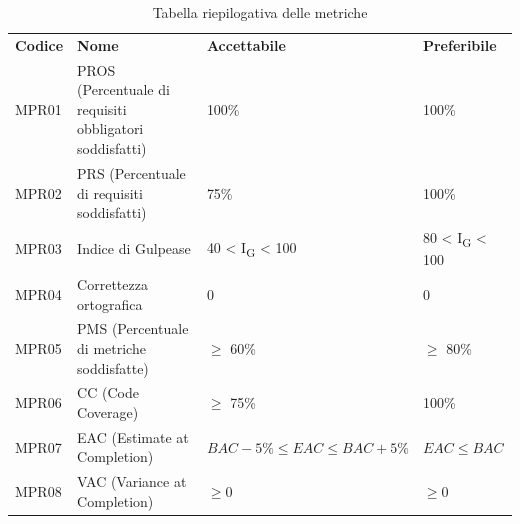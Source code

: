 \begin{center}
    \centering
    \renewcommand{\arraystretch}{1.8}
    \label{tab:TabellaRiepilogoMetriche}
    \begin{longtable}[!h]{p{45px} p{200px} p{105px} p{80px}}
        \caption{Tabella riepilogativa delle metriche}                                                                                                                     \\
        \rowcolor{logo!70}   \textbf{Codice} & \textbf{Nome}                                           & \textbf{Accettabile}              & \textbf{Preferibile}          \\
        MPR01                                & PROS (Percentuale di requisiti obbligatori soddisfatti) & 100\%                             & 100\%                         \\
        MPR02                                & PRS (Percentuale di requisiti soddisfatti)              & 75\%                              & 100\%                         \\
        MPR03                                & Indice di Gulpease                                      & 40 < I\textsubscript{G} < 100     & 80 < I\textsubscript{G} < 100 \\
        MPR04                                & Correttezza ortografica                                 & 0                                 & 0                             \\
        MPR05                                & PMS (Percentuale di metriche soddisfatte)               & $\geq$ 60\%                       & $\geq$ 80\%                   \\
        MPR06                                & CC (Code Coverage)                                      & $\geq$ 75\%                       & 100\%                         \\
        MPR07                                & EAC (Estimate at Completion)                            & $BAC -5\% \leq EAC \leq BAC +5\%$ & $EAC \leq BAC$                \\
        MPR08                                & VAC (Variance at Completion)                            & $\geq 0$                          & $\geq 0$                      \\

\end{longtable}
\end{center}
